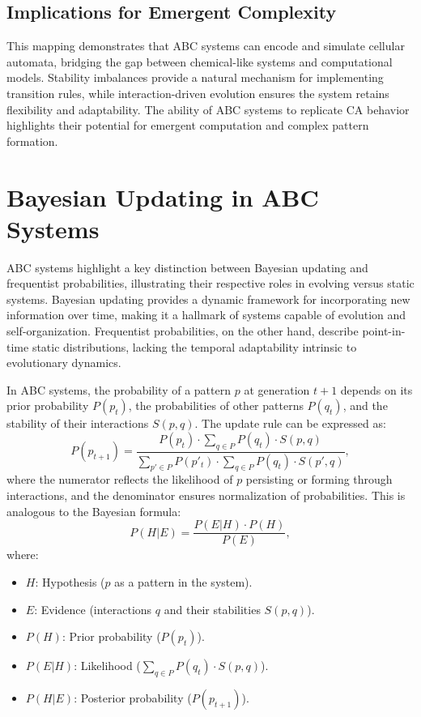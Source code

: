 \documentclass[entropy,article,submit,pdftex,moreauthors]{Definitions/mdpi}
\begin{document}
\subsection{Implications for Emergent Complexity}

This mapping demonstrates that ABC systems can encode and simulate cellular automata, bridging the gap between chemical-like systems and computational models. Stability imbalances provide a natural mechanism for implementing transition rules, while interaction-driven evolution ensures the system retains flexibility and adaptability. The ability of ABC systems to replicate CA behavior highlights their potential for emergent computation and complex pattern formation.

\section{Bayesian Updating in ABC Systems}

ABC systems highlight a key distinction between Bayesian updating and frequentist probabilities, illustrating their respective roles in evolving versus static systems. Bayesian updating provides a dynamic framework for incorporating new information over time, making it a hallmark of systems capable of evolution and self-organization. Frequentist probabilities, on the other hand, describe point-in-time static distributions, lacking the temporal adaptability intrinsic to evolutionary dynamics.

In ABC systems, the probability of a pattern \( p \) at generation \( t+1 \) depends on its prior probability \( P(p_t) \), the probabilities of other patterns \( P(q_t) \), and the stability of their interactions \( S(p, q) \). The update rule can be expressed as:
\[
P(p_{t+1}) = \frac{P(p_t) \cdot \sum_{q \in P} P(q_t) \cdot S(p, q)}{\sum_{p' \in P} P(p'_t) \cdot \sum_{q \in P} P(q_t) \cdot S(p', q)},
\]
where the numerator reflects the likelihood of \( p \) persisting or forming through interactions, and the denominator ensures normalization of probabilities. This is analogous to the Bayesian formula:
\[
P(H|E) = \frac{P(E|H) \cdot P(H)}{P(E)},
\]
where:
\begin{itemize}
    \item \( H \): Hypothesis (\( p \) as a pattern in the system).
    \item \( E \): Evidence (interactions \( q \) and their stabilities \( S(p, q) \)).
    \item \( P(H) \): Prior probability (\( P(p_t) \)).
    \item \( P(E|H) \): Likelihood (\( \sum_{q \in P} P(q_t) \cdot S(p, q) \)).
    \item \( P(H|E) \): Posterior probability (\( P(p_{t+1}) \)).
\end{itemize}
\end{document}
